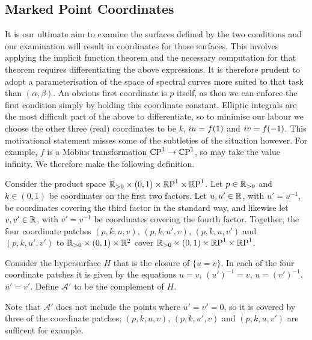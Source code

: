 \subsection{Marked Point Coordinates}
\label{sub:Reformulate}

It is our ultimate aim to examine the surfaces defined by the two conditions and our examination will result in coordinates for those surfaces. This involves applying the implicit function theorem and the necessary computation for that theorem requires differentiating the above expressions. It is therefore prudent to adopt a parameterisation of the space of spectral curves more suited to that task than $(α,β)$. An obvious first coordinate is $p$ itself, as then we can enforce the first condition simply by holding this coordinate constant. Elliptic integrals are the most difficult part of the above to differentiate, so to minimise our labour we choose the other three (real) coordinates to be $k$, $i u = f(1)$ and $i v = f(-1)$. This motivational statement misses some of the subtleties of the situation however. For example, $f$ is a M\"obius transformation $\mathbb{C}\text{P}^1 \to \mathbb{C}\text{P}^1$, so may take the value infinity. We therefore make the following definition.

\begin{defn}\label{defn:parameter space}
Consider the product space $\mathbb{R}_{>0} \times (0,1) \times \mathbb{R}\text{P}^1 \times \mathbb{R}\text{P}^1$. Let $p \in \mathbb{R}_{>0}$ and $k \in (0,1)$ be coordinates on the first two factors. Let $u, u' \in \mathbb{R}$, with $u' = u^{-1}$, be coordinates covering the third factor in the standard way, and likewise let $v, v' \in\mathbb{R}$, with $v' = v^{-1}$ be coordinates covering the fourth factor. Together, the four coordinate patches $(p,k,u,v)$, $(p,k,u',v)$, $(p,k,u,v')$ and $(p,k,u',v')$ to $\mathbb{R}_{>0} \times (0,1) \times \mathbb{R}^2$ cover $\mathbb{R}_{>0} \times (0,1) \times \mathbb{R}\text{P}^1 \times \mathbb{R}\text{P}^1$.

Consider the hypersurface $H$ that is the closure of $\{u=v\}$. In each of the four coordinate patches it is given by the equations $u=v$, $(u')^{-1} = v$, $u = (v')^{-1}$, $u' = v'$. Define $\mathcal{A}'$ to be the complement of $H$.
\end{defn}

Note that $\mathcal{A}'$ does not include the points where $u'=v'=0$, so it is covered by three of the coordinate patches; $(p,k,u,v)$, $(p,k,u',v)$ and $(p,k,u,v')$ are sufficent for example.

